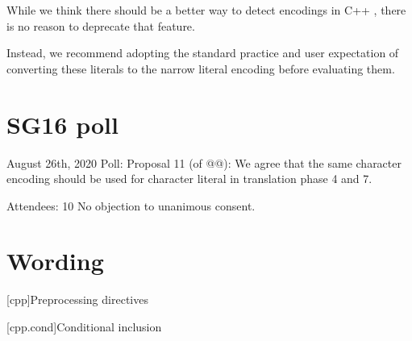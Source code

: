 \documentclass{wg21}
\begin{document}
While we think there should be a better way to detect encodings in C++ \cite{P1885R2}, there is no reason to deprecate that feature.

Instead, we recommend adopting the standard practice and user expectation of converting these literals to the narrow literal encoding before evaluating them.

\section{SG16 poll}

\begin{codeblock}
August 26th, 2020
Poll: Proposal 11 (of  @@): We agree that the same character encoding should be used 
for character literal in translation phase 4 and 7.

Attendees: 10
No objection to unanimous consent.
\end{codeblock}

\section{Wording}


[cpp]{Preprocessing directives}%

[cpp.cond]{Conditional inclusion}%
\end{document}
